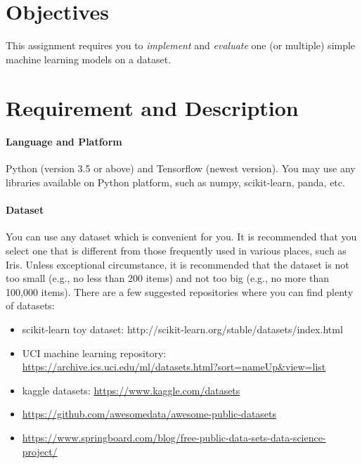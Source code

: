 \documentclass[12pt,a4]{article}
\begin{document}
\newpage





\section{Objectives}
This assignment requires you to \emph{implement} and \emph{evaluate} one (or multiple) simple machine learning models  on a dataset.  

\section{Requirement and Description}

\paragraph{Language and Platform} Python (version 3.5 or above) and Tensorflow (newest version). You may use any libraries available on Python platform, such as numpy, scikit-learn, panda, etc. 

\paragraph{Dataset} You can use any dataset which is convenient for you. It is recommended that you select one that is different from those frequently used in various places, such as Iris. Unless exceptional circumstance, it is recommended that the dataset is not too small (e.g., no less than 200 items) and not too big (e.g., no more than 100,000 items).  There are a few suggested repositories where you can find plenty of datasets: 
\begin{itemize}

\item scikit-learn toy dataset: http://scikit-learn.org/stable/datasets/index.html

\item UCI machine learning repository: \url{https://archive.ics.uci.edu/ml/datasets.html?sort=nameUp&view=list}

\item kaggle datasets: \url{https://www.kaggle.com/datasets}

\item \url{https://github.com/awesomedata/awesome-public-datasets}

\item \url{https://www.springboard.com/blog/free-public-data-sets-data-science-project/}

\end{itemize}
\end{document}
